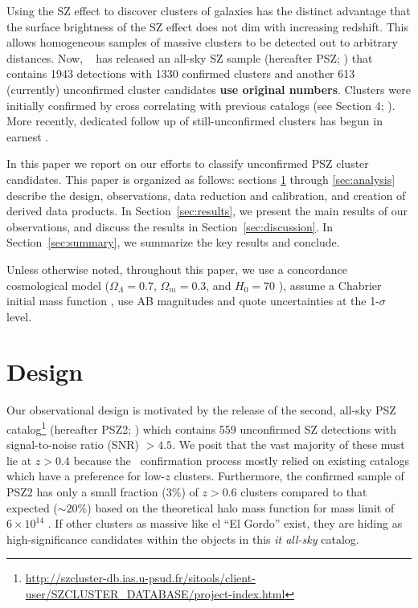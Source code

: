 \documentclass[apj, revtex4-1]{emulateapj}
\begin{document}
Using the SZ effect to discover clusters of galaxies has the distinct advantage that the surface brightness of the SZ effect does not dim with increasing redshift. This allows homogeneous samples of massive clusters to be detected out to arbitrary distances. Now, \planck\ \citep{Tauber2010, PlanckCollaboration2011} has released an all-sky SZ sample (hereafter PSZ; \citealt{PlanckCollaboration2014, PlanckCollaboration2015a}) that contains 1943 detections with 1330 confirmed clusters and another 613 (currently) unconfirmed cluster candidates {\bf use original numbers}. Clusters were initially confirmed by cross correlating with previous catalogs (see Section 4; \citealt{PlanckCollaboration2014}). More recently, dedicated follow up of still-unconfirmed clusters has begun in earnest .

In this paper we report on our efforts to classify unconfirmed PSZ cluster candidates. This paper is organized as follows: sections \ref{sec:design} through \ref{sec:analysis} describe the design, observations, data reduction and calibration, and creation of derived data products. In Section~\ref{sec:results}, we present the main results of our observations, and discuss the results in Section~\ref{sec:discussion}. In Section~\ref{sec:summary}, we summarize the key results and conclude.

Unless otherwise noted, throughout this paper, we use a concordance cosmological model ($\Omega_\Lambda = 0.7$, $\Omega_m = 0.3$, and $H_0= 70$ \kms \permpc), assume a Chabrier initial mass function \citep{Chabrier2003}, use AB magnitudes \citep{Oke1974} and quote uncertainties at the 1-$\sigma$ level.

\section{Design}\label{sec:design}
Our observational design is motivated by the release of the second, all-sky PSZ catalog\footnote{\url{http://szcluster-db.ias.u-psud.fr/sitools/client-user/SZCLUSTER_DATABASE/project-index.html}} (hereafter PSZ2; \citealt{PlanckCollaboration2015a}) which contains 559 unconfirmed SZ detections with signal-to-noise ratio (SNR) $> 4.5$. We posit that the vast majority of these must lie at $z>0.4$ because the \planck\ confirmation process \citep{PlanckCollaboration2014} mostly relied on existing catalogs which have a preference for low-$z$ clusters. Furthermore, the confirmed sample of PSZ2 has only a small fraction (3\%) of $z > 0.6$ clusters compared to that expected ($\sim20$\%) based on the theoretical halo mass function  for mass limit of $6\times10^{14}$ \msol. If other clusters as massive like el ``El Gordo'' exist, they are hiding as high-significance candidates within the objects in this \textit{it all-sky} catalog.
\end{document}
